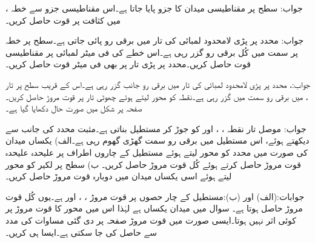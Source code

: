 جواب:
سطح  پر مقناطیسی میدان کا  جزو  پایا جاتا ہے۔اس مقناطیسی جزو سے خطہ ،  میں کثافت  پر قوت حاصل کریں۔

جواب:
 محدد پر پڑی لامحدود لمبائی کی تار میں  برقی رو پائی جاتی ہے۔سطح  پر خطہ  پر  سمت میں کُل  برقی رو گزر رہی ہے۔اس خطے کی فی میٹر لمبائی پر مقناطیسی قوت حاصل کریں۔محدد  پر پڑی تار پر بھی فی میٹر قوت حاصل کریں۔

جواب:، 
محدد  پر پڑی لامحدود لمبائی کی تار میں  برقی رو  جانب گزر رہی ہے۔اس کے قریب سطح  پر تار ،  میں  برقی رو  سمت میں گزر رہی ہے۔نقطہ  کو محور لیتے ہوئے چھوٹی تار پر قوت مروڑ حاصل کریں۔صفحہ  پر شکل  میں صورت حال دکھایا گیا ہے۔

جواب:
موصل تار نقطہ ، ،  اور  کو جوڑ کر مستطیل بناتی ہے۔مثبت  محدد کی جانب سے دیکھتے ہوئے، اس مستطیل میں  برقی رو سمت گھڑی گھوم رہی ہے۔الف)  یکساں میدان  کی صورت میں  محدد  کو محور لیتے ہوئے مستطیل کے چاروں اطراف پر علیحدہ علیحدہ  قوت مروڑ حاصل کرتے ہوئے کُل قوت مروڑ حاصل کریں۔ ب) سطح  پر لکیر  کو محور لیتے ہوئے اسی یکساں میدان میں دوبارہ قوت مروڑ حاصل کریں۔

جوابات:(الف) اور (ب):مستطیل کے چار حصوں پر قوت مروڑ ، ،  اور  ہے۔یوں کُل قوت مروڑ  حاصل ہوتا ہے۔
سوال  میں میدان یکساں ہے لہٰذا اس میں محور کا قوت مروڑ پر کوئی اثر نہیں ہوتا۔ایسی صورت میں قوت مروڑ صفحہ  پر دی گئی مساوات  کی مدد سے حاصل کی جا سکتی ہے۔ایسا ہی کریں۔

